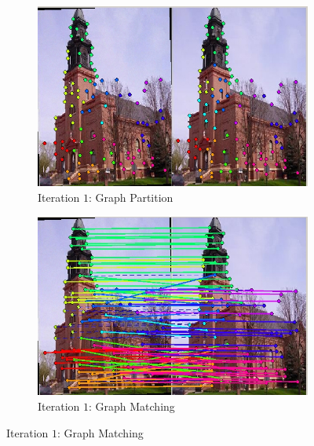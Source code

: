 \documentclass[
	fontsize=12pt,
	paper=a4,
	twoside=false,
	numbers=noenddot,
	plainheadsepline,
	toc=listof,
	toc=bibliography
]{scrartcl}
\makeatletter
\providecommand\phantomcaption{\caption@refstepcounter\@captype}
\makeatother
\begin{document}
\begin{figure}[ht]
	\begin{subfigure}[b]{0.5\textwidth}
		\centering
		\includegraphics[scale=0.35]{fig/method2/test_imagetrafo1/partition_it1.jpg} 
		\caption{Iteration $1$: Graph Partition} 
	\end{subfigure}%
	\begin{subfigure}[b]{0.5\textwidth}
		\centering
		\includegraphics[scale=0.35]{fig/method2/test_imagetrafo1/LL_it1.jpg} 
		\caption{Iteration $1$: Graph Matching} 
	\end{subfigure} 
	\phantomcaption
\end{figure}
\end{document}
